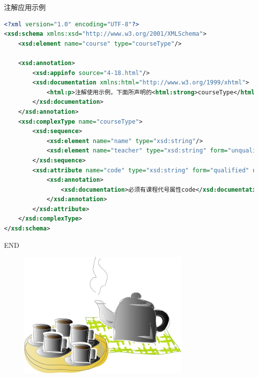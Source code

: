 \begin{frame}{注解应用示例 }
\begin{lstlisting}[tabsize=8, basicstyle=\small\tt, language=XML]
<?xml version="1.0" encoding="UTF-8"?>
<xsd:schema xmlns:xsd="http://www.w3.org/2001/XMLSchema">
    <xsd:element name="course" type="courseType"/>
    
    <xsd:annotation>
        <xsd:appinfo source="4-18.html"/>
        <xsd:documentation xmlns:html="http://www.w3.org/1999/xhtml">
            <html:p>注解使用示例，下面所声明的<html:strong>courseType</html:strong>自定义复杂类型，为课程类型，包含两个子元素和一个属性。</html:p>
        </xsd:documentation>
    </xsd:annotation>
    <xsd:complexType name="courseType">
        <xsd:sequence>
            <xsd:element name="name" type="xsd:string"/>
            <xsd:element name="teacher" type="xsd:string" form="unqualified"/>
        </xsd:sequence>
        <xsd:attribute name="code" type="xsd:string" form="qualified" use="required">
            <xsd:annotation>
                <xsd:documentation>必须有课程代号属性code</xsd:documentation>
            </xsd:annotation>
        </xsd:attribute>
    </xsd:complexType>
</xsd:schema>
\end{lstlisting}
\end{frame}


\begin{frame}
\begin{center}
    \Huge END
\end{center}
\begin{figure}
    \includegraphics[width=0.75\textwidth]{figure/relax.png}
\end{figure}
\end{frame}

